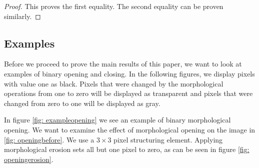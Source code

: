 \documentclass[a4paper,12pt]{article}
\theoremstyle{plain}
\theoremstyle{definition}
\begin{document}
\begin{proof}
	This proves the first equality. The second equality can be proven similarly.
\end{proof}

\newpage

\subsection{Examples}

Before we proceed to prove the main results of this paper, we want to look at examples of binary opening and closing. In the following figures, we display pixels with value one as black. Pixels that were changed by the morphological operations from one to zero will be displayed as transparent and pixels that were changed from zero to one will be displayed as gray.

In figure \ref{fig: exampleopening} we see an example of binary morphological opening. We want to examine the effect of morphological opening on the image in \ref{fig: openingbefore}. We use a $3 \times 3$ pixel structuring element. Applying morphological erosion sets all but one pixel to zero, as can be seen in figure \ref{fig: openingerosion}.
\end{document}
